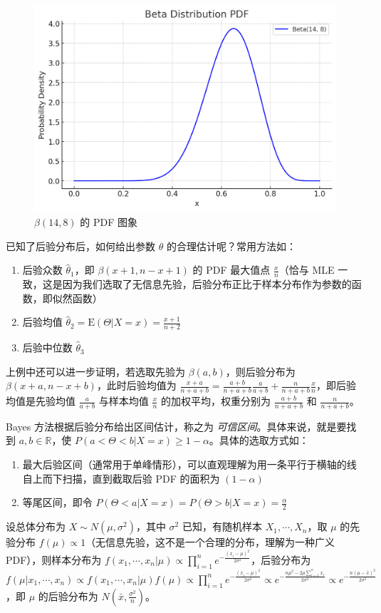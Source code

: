 \documentclass[../main.tex]{subfiles}
\begin{document}
\begin{figure}[!ht]
    \centering
    \includegraphics[scale=0.4]{figures/beta(14,8).png}
    \caption{$\beta(14,8)$ 的 PDF 图象}
    \label{fig:6.5.1}
\end{figure}

已知了后验分布后，如何给出参数 $\theta$ 的合理估计呢？常用方法如：
\begin{enumerate}
    \item 后验众数 $\hat\theta_1$，即 $\beta(x+1,n-x+1)$ 的 PDF 最大值点 $\frac xn$（恰与 MLE 一致，这是因为我们选取了无信息先验，后验分布正比于样本分布作为参数的函数，即似然函数）
    \item 后验均值 $\hat\theta_2=\mathrm E(\Theta|X=x)=\frac{x+1}{n+2}$
    \item 后验中位数 $\hat\theta_3$
\end{enumerate}

上例中还可以进一步证明，若选取先验为 $\beta(a,b)$，则后验分布为 $\beta(x+a,n-x+b)$，此时后验均值为 $\frac{x+a}{n+a+b}=\frac{a+b}{n+a+b}\frac{a}{a+b}+\frac{n}{n+a+b}\frac{x}{n}$，即后验均值是先验均值 $\frac a{a+b}$ 与样本均值 $\frac xn$ 的加权平均，权重分别为 $\frac{a+b}{n+a+b}$ 和 $\frac{n}{n+a+b}$。

Bayes 方法根据后验分布给出区间估计，称之为 \emph{可信区间}。具体来说，就是要找到 $a,b\in\mathbb R$，使 $P(a<\Theta<b|X=x)\geq1-\alpha$。具体的选取方式如：
\begin{enumerate}
    \item 最大后验区间（通常用于单峰情形），可以直观理解为用一条平行于横轴的线自上而下扫描，直到截取后验 PDF 的面积为 $(1-\alpha)$
    \item 等尾区间，即令 $P(\Theta<a|X=x)=P(\Theta>b|X=x)=\frac\alpha2$
\end{enumerate}

\begin{example}
    设总体分布为 $X\sim N(\mu,\sigma^2)$，其中 $\sigma^2$ 已知，有随机样本 $X_1,\cdots,X_n$，取 $\mu$ 的先验分布 $f(\mu)\propto 1$（无信息先验，这不是一个合理的分布，理解为一种广义 PDF），则样本分布为 $f(x_1,\cdots,x_n|\mu)\propto\prod_{i=1}^ne^{-\frac{(x_i-\mu)^2}{2\sigma^2}}$，后验分布为 $f(\mu|x_1,\cdots,x_n)\propto f(x_1,\cdots,x_n|\mu)f(\mu)\propto\prod_{i=1}^ne^{-\frac{(x_i-\mu)^2}{2\sigma^2}}\propto e^{-\frac{n\mu^2-2\mu\sum_{i=1}^nx_i}{2\sigma^2}}\propto e^{-\frac{n(\mu-\bar x)^2}{2\sigma^2}}$，即 $\mu$ 的后验分布为 $N(\bar x,\frac{\sigma^2}{n})$。
\end{example}
\end{document}
